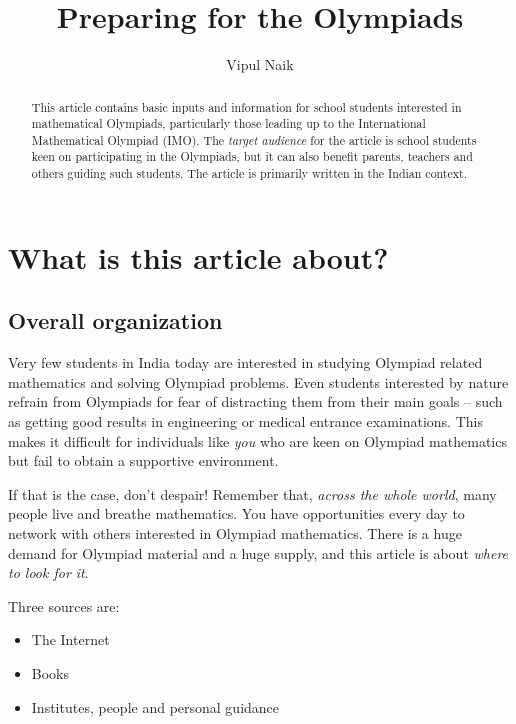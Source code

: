 \documentclass[a4paper]{amsart}
\title{Preparing for the Olympiads}
\author{Vipul Naik}
\begin{document}
\maketitle

\begin{abstract}
  This article contains basic inputs and information for school students interested in mathematical Olympiads,
  particularly those leading up to the International Mathematical Olympiad (IMO). The {\em target audience}
  for the article is school students keen on participating in the Olympiads, but it can also benefit
  parents, teachers and others guiding
  such students. The article is primarily written in the Indian context.
\end{abstract}

\section{What is this article about?}

\subsection{Overall organization}

Very few students in India today are interested in studying Olympiad
related mathematics and solving Olympiad problems.  Even students
interested by nature refrain from Olympiads for fear of distracting
them from their main goals -- such as getting good results in
engineering or medical entrance examinations.  This makes it difficult
for individuals like {\em you} who are keen on Olympiad mathematics but fail
to obtain a supportive environment.

If that is the case, don't despair!
Remember that, {\em across the whole world}, many people live and breathe mathematics. You have opportunities every day to network
with others interested in Olympiad mathematics. There is a huge demand for Olympiad material and a huge supply, and this article
is about {\em where to look for it}.

Three sources are:

\begin{itemize}

\item The Internet

\item Books

\item Institutes, people and personal guidance

\end{itemize}
\end{document}
